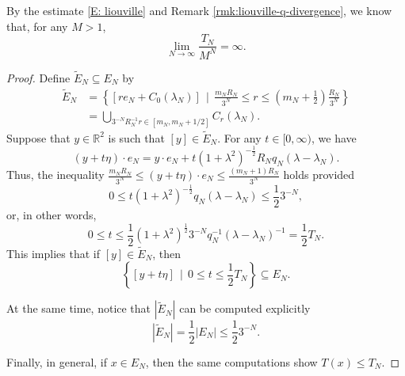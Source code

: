 \documentclass[12pt]{amsart}
\newcommand{\R}{\mathbb{R}}
\begin{document}
By the estimate \eqref{E: liouville} and Remark \ref{rmk:liouville-q-divergence}, we know that, for any $M > 1$, 
	\begin{equation} \label{E: superexponential liouville}
		\lim_{N \to \infty} \frac{ T_{N} }{ M^{N} } = \infty.
	\end{equation}
	
		\begin{proof} Define $\tilde{E}_{N} \subseteq E_{N}$ by
			\begin{align*}
				\tilde{E}_{N} &= \left\{ [r e_{N} + C_{0}(\lambda_{N})] \, \mid \, \frac{m_{N} R_{N}}{3^{N}} \leq r \leq \left( m_{N} + \frac{1}{2} \right) \frac{R_{N}}{3^{N}} \right\} \\
				&= \bigcup_{3^{-N} R_{N}^{-1} r \in [m_{N}, m_{N} + 1/2]} C_{r}(\lambda_{N}).
			\end{align*}
		Suppose that $ y \in \R^2 $ is such that $ [ y ] \in \tilde E_N $. For any $t \in [0,\infty)$, we have
			\begin{equation*}
				(y + t \eta) \cdot e_{N} = y \cdot e_{N} + t (1 + \lambda^{2})^{-\frac{1}{2}} R_{N} q_{N} (\lambda - \lambda_{N}).
			\end{equation*}
		Thus, the inequality $\frac{m_{N} R_{N}}{3^{N}} \leq (y + t \eta) \cdot e_{N} \leq \frac{(m_{N} + 1) R_{N}}{3^{N}}$ holds provided
			\begin{equation*}
				0 \leq t (1 + \lambda^{2})^{-\frac{1}{2}} q_{N} (\lambda - \lambda_{N}) \leq \frac{1}{2} 3^{-N},
			\end{equation*}
		or, in other words,
			\begin{equation*}
				0 \leq t \leq \frac{1}{2} (1 + \lambda^{2})^{\frac{1}{2}} 3^{-N} q_{N}^{-1} (\lambda - \lambda_{N})^{-1} = \frac{1}{2} T_{N}.
			\end{equation*}
	This implies that if $[y] \in \tilde{E}_{N}$, then
			\begin{equation*}
				\left\{ [y + t \eta] \, \mid \, 0 \leq t \leq \frac{1}{2} T_{N} \right\} \subseteq E_{N}.
			\end{equation*}
	
	At the same time, notice that $|\tilde{E}_{N}|$ can be computed explicitly
			\begin{equation*}
				|\tilde{E}_{N}| = \frac{1}{2} |E_{N}| \leq \frac{1}{2} 3^{-N}.
			\end{equation*}
		
		Finally, in general, if $x \in E_{N}$, then the same computations show $T(x) \leq T_{N}$. 
		\end{proof}
		
\end{document}
